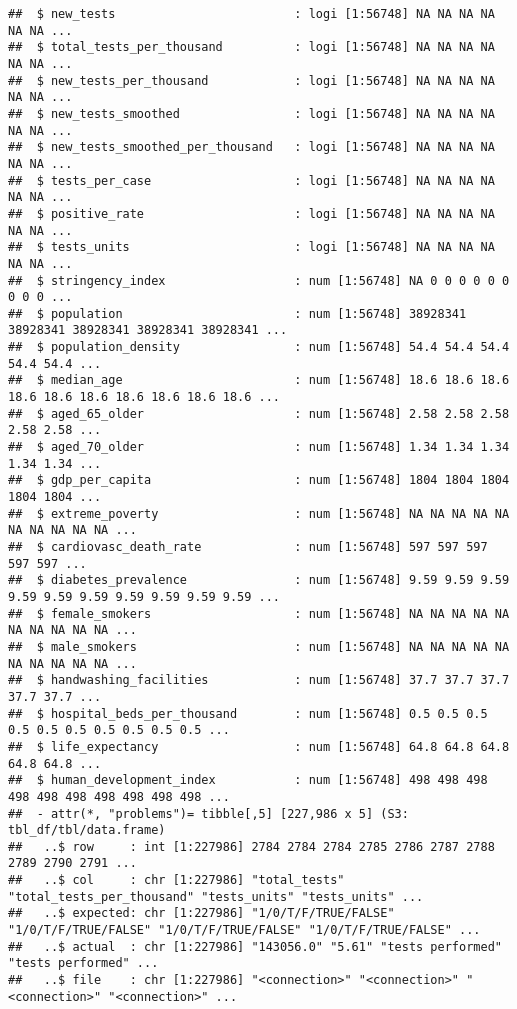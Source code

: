 \documentclass[
]{article}
\begin{document}
\begin{verbatim}
##  $ new_tests                         : logi [1:56748] NA NA NA NA NA NA ...
##  $ total_tests_per_thousand          : logi [1:56748] NA NA NA NA NA NA ...
##  $ new_tests_per_thousand            : logi [1:56748] NA NA NA NA NA NA ...
##  $ new_tests_smoothed                : logi [1:56748] NA NA NA NA NA NA ...
##  $ new_tests_smoothed_per_thousand   : logi [1:56748] NA NA NA NA NA NA ...
##  $ tests_per_case                    : logi [1:56748] NA NA NA NA NA NA ...
##  $ positive_rate                     : logi [1:56748] NA NA NA NA NA NA ...
##  $ tests_units                       : logi [1:56748] NA NA NA NA NA NA ...
##  $ stringency_index                  : num [1:56748] NA 0 0 0 0 0 0 0 0 0 ...
##  $ population                        : num [1:56748] 38928341 38928341 38928341 38928341 38928341 ...
##  $ population_density                : num [1:56748] 54.4 54.4 54.4 54.4 54.4 ...
##  $ median_age                        : num [1:56748] 18.6 18.6 18.6 18.6 18.6 18.6 18.6 18.6 18.6 18.6 ...
##  $ aged_65_older                     : num [1:56748] 2.58 2.58 2.58 2.58 2.58 ...
##  $ aged_70_older                     : num [1:56748] 1.34 1.34 1.34 1.34 1.34 ...
##  $ gdp_per_capita                    : num [1:56748] 1804 1804 1804 1804 1804 ...
##  $ extreme_poverty                   : num [1:56748] NA NA NA NA NA NA NA NA NA NA ...
##  $ cardiovasc_death_rate             : num [1:56748] 597 597 597 597 597 ...
##  $ diabetes_prevalence               : num [1:56748] 9.59 9.59 9.59 9.59 9.59 9.59 9.59 9.59 9.59 9.59 ...
##  $ female_smokers                    : num [1:56748] NA NA NA NA NA NA NA NA NA NA ...
##  $ male_smokers                      : num [1:56748] NA NA NA NA NA NA NA NA NA NA ...
##  $ handwashing_facilities            : num [1:56748] 37.7 37.7 37.7 37.7 37.7 ...
##  $ hospital_beds_per_thousand        : num [1:56748] 0.5 0.5 0.5 0.5 0.5 0.5 0.5 0.5 0.5 0.5 ...
##  $ life_expectancy                   : num [1:56748] 64.8 64.8 64.8 64.8 64.8 ...
##  $ human_development_index           : num [1:56748] 498 498 498 498 498 498 498 498 498 498 ...
##  - attr(*, "problems")= tibble[,5] [227,986 x 5] (S3: tbl_df/tbl/data.frame)
##   ..$ row     : int [1:227986] 2784 2784 2784 2785 2786 2787 2788 2789 2790 2791 ...
##   ..$ col     : chr [1:227986] "total_tests" "total_tests_per_thousand" "tests_units" "tests_units" ...
##   ..$ expected: chr [1:227986] "1/0/T/F/TRUE/FALSE" "1/0/T/F/TRUE/FALSE" "1/0/T/F/TRUE/FALSE" "1/0/T/F/TRUE/FALSE" ...
##   ..$ actual  : chr [1:227986] "143056.0" "5.61" "tests performed" "tests performed" ...
##   ..$ file    : chr [1:227986] "<connection>" "<connection>" "<connection>" "<connection>" ...

\end{verbatim}
\end{document}
